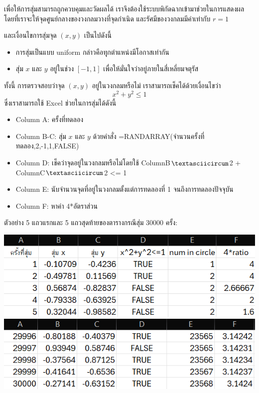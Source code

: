 เพื่อให้การสุ่มสามารถถูกควบคุมและวัดผลได้ เราจึงต้องใช้ระบบพิกัดฉากเข้ามาช่วยในการแสดงผล โดยที่เราจะให้จุดศูนย์กลางของวงกลมวางที่จุดกำเนิด และรัศมีของวงกลมมีค่าเท่ากับ $r=1$
\begin{center}
\end{center}
และเงื่อนไขการสุ่มจุด $(x,y)$ เป็นไปดังนี้
\begin{itemize}
    \item การสุ่มเป็นแบบ uniform กล่าวคือทุุกตำแหน่งมีโอกาสเท่ากัน
    \item สุ่ม $x$ และ $y$ อยู่ในช่วง $[-1,1]$ เพื่อให้มั่นใจว่าอยู่ภายในสี่เหลี่ยมจตุรัส
\end{itemize}
ทั้งนี้ การตรวจสอบว่าจุด $(x,y)$ อยู่ในวงกลมหรือไม่ เราสามารถเช็คได้ด้วยเงื่อนไขว่า
$$
x^2 + y^2 \leq 1
$$
ซึ่งเราสามารถใช้ Excel ช่วยในการสุ่มได้ดังนี้
\begin{itemize}
    \item Column A: ครั้งที่ทดลอง
    \item Column B-C: สุ่ม $x$ และ $y$ ด้วยคำสั่ง =RANDARRAY(จำนวนครั้งที่ทดลอง,2,-1,1,FALSE)
    \item Column D: เช็คว่าจุดอยู่ในวงกลมหรือไม่โดยใช้ ColumnB$\textasciicircum$2 + ColumnC$\textasciicircum$2 <= 1
    \item Column E: นับจำนวนจุดที่อยู่ในวงกลมตั้งแต่การทดลองที่ 1 จนถึงการทดลองปัจจุบัน
    \item Column F: หาค่า 4*อัตราส่วน
\end{itemize}
ตัวอย่าง 5 แถวแรกและ 5 แถวสุดท้ายของตารางกรณีสุ่ม 30000 ครั้ง:
\begin{center}
    \includegraphics[width=0.7\linewidth]{image.png}
    \includegraphics[width=0.7\linewidth]{image2.png}
\end{center}

